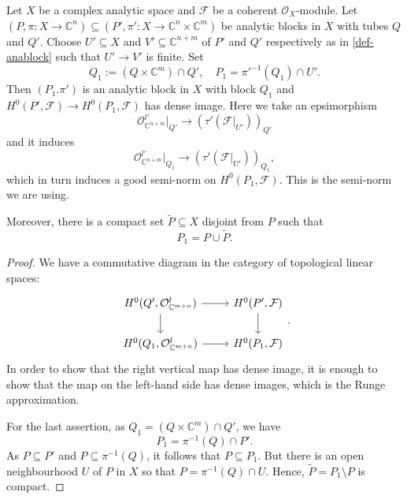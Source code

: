 \begin{lemma}\label{lma-denseimage}
    Let $X$ be a complex analytic space and $\mathcal{F}$ be a coherent $\mathcal{O}_X$-module. Let
    $(P,\pi:X\rightarrow  \mathbb{C}^n)\subseteq (P',\pi':X\rightarrow \mathbb{C}^n\times \mathbb{C}^m)$ be analytic blocks in $X$ with tubes $Q$ and $Q'$. Choose $U'\subseteq X$ and $V'\subseteq \mathbb{C}^{n+m}$ of $P'$ and $Q'$ respectively as in \cref{def-anablock} such that $U'\rightarrow V'$ is finite. Set
    \[
        Q_1:=(Q\times \mathbb{C}^m)\cap Q',\quad P_1=\pi'^{-1}(Q_1)\cap U'.  
    \]
    Then $(P_1.\pi')$ is an analytic block in $X$ with block $Q_1$ and 
    $H^0(P',\mathcal{F})\rightarrow H^0(P_1,\mathcal{F})$ has dense image. Here we take an epsimorphism 
    \[
        \mathcal{O}_{\mathbb{C}^{n+m}}^{l'}|_{Q'}\rightarrow \left(\tau' (\mathcal{F}|_{U'}) \right)_{Q'} 
    \]
    and it induces 
    \[
        \mathcal{O}_{\mathbb{C}^{n+m}}^{l'}|_{Q_1}\rightarrow \left(\tau' (\mathcal{F}|_{U'}) \right)_{Q_1},
    \]
    which in turn induces a good semi-norm on $H^0(P_1,\mathcal{F})$. This is the semi-norm we are using.

    Moreover, there is a compact set $\tilde{P}\subseteq X$ disjoint from $P$ such that
    \[
        P_1=P\cup \tilde{P}.  
    \]
\end{lemma}
\begin{proof}
    We have a commutative diagram in the category of topological linear spaces:
    \[
        \begin{tikzcd}
            {H^0(Q',\mathcal{O}_{\mathbb{C}^{m+n}}^l)} \arrow[r] \arrow[d] & {H^0(P',\mathcal{F})} \arrow[d] \\
            {H^0(Q_1,\mathcal{O}_{\mathbb{C}^{m+n}}^l)} \arrow[r]          & {H^0(P_1,\mathcal{F})}         
        \end{tikzcd}.
    \]
    In order to show that the right vertical map has dense image, it is enough to show that the map on the left-hand side has dense images, which is the Runge approximation.

    For the last assertion, as $Q_1=(Q\times \mathbb{C}^m)\cap Q'$, we have
    \[
        P_1=\pi^{-1}(Q)\cap P'.  
    \]
    As $P\subseteq P'$ and $P\subseteq \pi^{-1}(Q)$, it follows that $P\subseteq P_1$. But there is an open neighbourhood $U$ of $P$ in $X$ so that $P=\pi^{-1}(Q)\cap U$. Hence, $\tilde{P}=P_1\setminus P$ is compact.
\end{proof}

